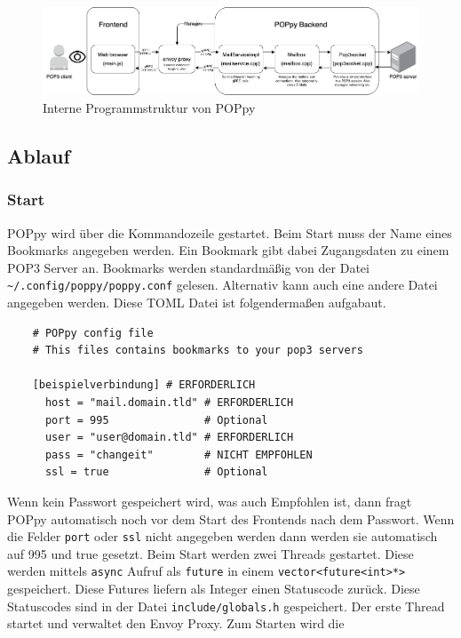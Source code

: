 \documentclass[12pt]{article}
\def\code#1{\texttt{#1}}
\begin{document}
\begin{figure}[htbp]
    \includegraphics[scale=0.4]{poppy_app_diagram}
    \caption{Interne Programmstruktur von POPpy}
    \label{fig:situation2}
\end{figure}
\FloatBarrier

\subsection{Ablauf}
\subsubsection{Start}
POPpy wird über die Kommandozeile gestartet. Beim Start muss der Name eines
Bookmarks angegeben werden. Ein Bookmark gibt dabei Zugangsdaten zu einem POP3 
Server an. Bookmarks werden standardmäßig von der Datei 
\code{\textasciitilde /.config/poppy/poppy.conf} gelesen. Alternativ kann auch eine andere 
Datei angegeben werden. Diese TOML Datei ist folgendermaßen aufgabaut.
\begin{verbatim}
    # POPpy config file
    # This files contains bookmarks to your pop3 servers

    [beispielverbindung] # ERFORDERLICH
      host = "mail.domain.tld" # ERFORDERLICH
      port = 995               # Optional
      user = "user@domain.tld" # ERFORDERLICH
      pass = "changeit"        # NICHT EMPFOHLEN 
      ssl = true               # Optional 
\end{verbatim}
Wenn kein Passwort gespeichert wird, was auch Empfohlen ist, dann fragt POPpy
automatisch noch vor dem Start des Frontends nach dem Passwort. Wenn die Felder
\code{port} oder \code{ssl} nicht angegeben werden dann werden sie automatisch
auf 995 und true gesetzt. 
\newline
\newline
Beim Start werden zwei Threads gestartet. Diese werden mittels \code{async}
Aufruf als \code{future} in einem \code{vector<future<int>*>} gespeichert.
Diese Futures liefern als Integer einen Statuscode zurück. Diese Statuscodes
sind in der Datei \code{include/globals.h} gespeichert.
\newline
Der erste Thread startet und verwaltet den Envoy Proxy. Zum Starten wird die
\end{document}
